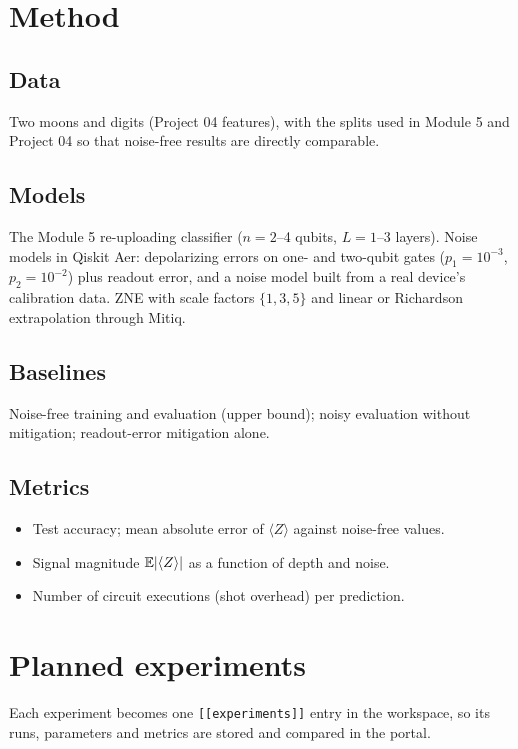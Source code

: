 \documentclass[11pt,a4paper]{article}
\begin{document}
\section{Method}
\subsection{Data}
Two moons and digits (Project 04 features), with the splits used in Module 5 and Project 04 so that
noise-free results are directly comparable.

\subsection{Models}
The Module 5 re-uploading classifier ($n=2$--4 qubits, $L=1$--3 layers). Noise models in Qiskit Aer:
depolarizing errors on one- and two-qubit gates ($p_1=10^{-3}$, $p_2=10^{-2}$) plus readout error, and a
noise model built from a real device's calibration data. ZNE with scale factors $\{1,3,5\}$ and linear or
Richardson extrapolation through Mitiq.

\subsection{Baselines}
Noise-free training and evaluation (upper bound); noisy evaluation without mitigation; readout-error
mitigation alone.

\subsection{Metrics}
\begin{itemize}
  \item Test accuracy; mean absolute error of $\langle Z\rangle$ against noise-free values.
  \item Signal magnitude $\mathbb{E}|\langle Z\rangle|$ as a function of depth and noise.
  \item Number of circuit executions (shot overhead) per prediction.
\end{itemize}

\section{Planned experiments}
Each experiment becomes one \texttt{[[experiments]]} entry in the workspace, so its runs, parameters
and metrics are stored and compared in the portal.
\end{document}
